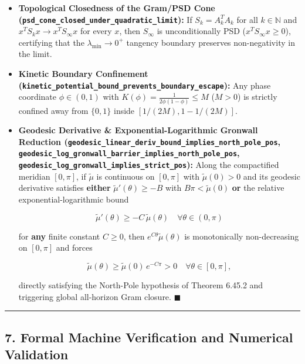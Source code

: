 \documentclass[
  11pt,
]{article}
\begin{document}
\begin{enumerate}
  \begin{itemize}
  \item
    \textbf{Topological Closedness of the Gram/PSD Cone
    (\texttt{psd\_cone\_closed\_under\_quadratic\_limit}):} If
    \(S_k = A_k^T A_k\) for all \(k \in \mathbb{N}\) and
    \(x^T S_k x \to x^T S_\infty x\) for every \(x\), then \(S_\infty\)
    is unconditionally PSD (\(x^T S_\infty x \ge 0\)), certifying that
    the \(\lambda_{\min} \to 0^+\) tangency boundary preserves
    non-negativity in the limit.
  \item
    \textbf{Kinetic Boundary Confinement
    (\texttt{kinetic\_potential\_bound\_prevents\_boundary\_escape}):}
    Any phase coordinate \(\phi \in (0, 1)\) with
    \(K(\phi) = \frac{1}{2\phi(1-\phi)} \le M\) (\(M > 0\)) is strictly
    confined away from \(\{0, 1\}\) inside \([1/(2M), 1 - 1/(2M)]\).
  \item
    \textbf{Geodesic Derivative \& Exponential-Logarithmic Gronwall
    Reduction
    (\texttt{geodesic\_linear\_deriv\_bound\_implies\_north\_pole\_pos},
    \texttt{geodesic\_log\_gronwall\_barrier\_implies\_north\_pole\_pos},
    \texttt{geodesic\_log\_gronwall\_implies\_strict\_pos}):} Along the
    compactified meridian \([0, \pi]\), if \(\tilde{\mu}\) is continuous
    on \([0, \pi]\) with \(\tilde{\mu}(0) > 0\) and its geodesic
    derivative satisfies \textbf{either} \(\tilde{\mu}'(\theta) \ge -B\)
    with \(B\pi < \tilde{\mu}(0)\) \textbf{or} the relative
    exponential-logarithmic bound

    \[\tilde{\mu}'(\theta) \ge -C\,\tilde{\mu}(\theta) \quad \forall \theta \in (0, \pi)\]

    for \textbf{any} finite constant \(C \ge 0\), then
    \(e^{C\theta}\tilde{\mu}(\theta)\) is monotonically non-decreasing
    on \([0, \pi]\) and forces

    \[\tilde{\mu}(\theta) \ge \tilde{\mu}(0)\,e^{-C\pi} > 0 \quad \forall \theta \in [0, \pi],\]

    directly satisfying the North-Pole hypothesis of Theorem 6.45.2 and
    triggering global all-horizon Gram closure. \(\blacksquare\)
  \end{itemize}
\end{enumerate}

\begin{center}\rule{0.5\linewidth}{0.5pt}\end{center}

\subsection{7. Formal Machine Verification and Numerical
Validation}\label{formal-machine-verification-and-numerical-validation}
\end{document}

